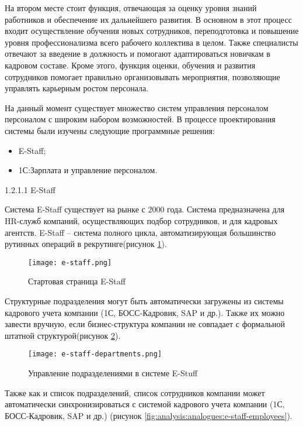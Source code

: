 На втором месте стоит функция, отвечающая за оценку уровня знаний работников и обеспечение их дальнейшего развития.
В основном в этот процесс входит осуществление обучения новых сотрудников, переподготовка и повышение уровня
профессионализма всего рабочего коллектива в целом. Также специалисты отвечают за введение в должность и помогают
адаптироваться новичкам в кадровом составе. Кроме этого, функция оценки, обучения и развития сотрудников помогает
правильно организовывать мероприятия, позволяющие управлять карьерным ростом персонала.

На данный момент существует множество систем управления персоналом персоналом с широким набором возможностей. В
процессе проектирования системы были изучены следующие программные решения:
\begin{itemize}
	\item E-Staff;
	\item 1С:Зарплата и управление персоналом.
\end{itemize}

1.2.1.1 E-Staff

Система E-Staff существует на рынке с 2000 года. Система предназначена для HR-служб компаний, осуществляющих подбор
сотрудников, и для кадровых агентств. E-Staff -- система полного цикла, автоматизирующая большинство рутинных операций
в рекрутинге(рисунок \ref{fig:analysis:analogues:e-staff}).
\pagebreak

\begin{figure}
	\centering
	\texttt{[image: e-staff.png]} 
	\caption{Стартовая страница E-Staff}
	\label{fig:analysis:analogues:e-staff}
\end{figure}

Структурные подразделения могут быть автоматически загружены из системы кадрового учета компании
(1С, БОСС-Кадровик, SAP и др.). Также их можно завести вручную, если бизнес-структура компании не совпадает с
формальной штатной структурой(рисунок \ref{fig:analysis:analogues:e-staff-departments}).

\begin{figure}[!h]
	\centering
	\texttt{[image: e-staff-departments.png]} 
	\caption{Управление подразделениями в системе E-Stuff}
	\label{fig:analysis:analogues:e-staff-departments}
\end{figure}

Также как и список подразделений, список сотрудников компании может автоматически синхронизироваться с системой
кадрового учета компании (1С, БОСС-Кадровик, SAP и др.) (рисунок \ref{fig:analysis:analogues:e-staff-employees}).

